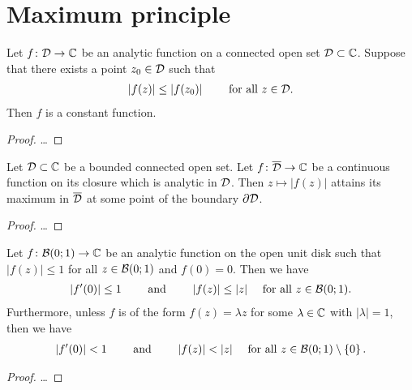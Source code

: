 \section{Maximum principle}

\begin{theorem}
  \label{thm:maximum_principle}
  Let $f \colon \Domain \to \bC$ be an analytic function on a
  connected open set $\Domain \subset \bC$.
  Suppose that there exists a point $z_0 \in \Domain$
  such that
  \begin{align*}
    |f(z)| \le |f(z_0)| \qquad \text{ for all } z \in \Domain .
  \end{align*}
  Then $f$ is a constant function.
\end{theorem}
\begin{proof}
  \ldots
\end{proof}

\begin{corollary}
  \label{cor:maximum_modulus_on_boundary}
  Let $\Domain \subset \bC$ be a bounded connected open set.
  Let $f \colon \closOf{\Domain} \to \bC$ be a continuous function
  on its closure which is analytic in $\Domain$.
  Then $z \mapsto |f(z)|$ attains its maximum in $\closOf{\Domain}$
  at some point of the boundary $\bdry \Domain$.
\end{corollary}
\begin{proof}
  \ldots
\end{proof}

\begin{lemma}
  \label{lem:schwarz_lemma}
  Let $f \colon \DiskRC{1}{0} \to \bC$ be an analytic function
  on the open unit disk such that $|f(z)| \le 1$
  for all $z \in \DiskRC{1}{0}$ and $f(0) = 0$.
  Then we have
  \begin{align*}
    |f'(0)| \le 1
    \qquad \text{ and } \qquad
    |f(z)| \le |z| \quad \text{ for all } z \in \DiskRC{1}{0} .
  \end{align*}
  Furthermore, unless $f$ is of the form $f(z) = \lambda z$ for
  some $\lambda \in \bC$ with $|\lambda| = 1$, then we have
  \begin{align*}
    |f'(0)| < 1
    \qquad \text{ and } \qquad
    |f(z)| < |z| \quad \text{ for all } z \in \DiskRC{1}{0} \setminus \set{0}.
  \end{align*}
\end{lemma}
\begin{proof}
  \ldots
\end{proof}



